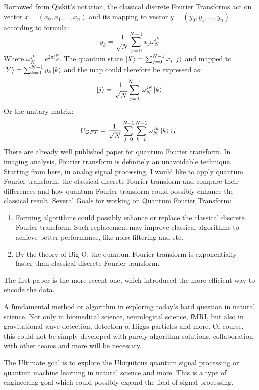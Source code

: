 \documentclass{article}
\begin{document}
Borrowed from Qiskit's notation, the classical discrete Fourier Transforms 
act on vector $x = (x_0, x_1,...,x_n)$ and its mapping to vector $y = (y_0, y_1,...,y_n)$
according to formula:
\begin{equation}
  y_k = \frac{1}{\sqrt{N}} \sum^{N-1}_{j=0} x_j \omega_N^{jk}
\end{equation}
Where $\omega_N^{jk} = e^{2\pi i \frac{jk}{N}}$. The quantum state 
$ \ket{X} = \sum^{N-1}_{j=0} x_j \ket{j} $ and mapped to $ \ket{Y} = \sum^{N-1}_{k=0} y_k \ket{k} $ 
and the map could therefore be expressed as:
\begin{equation}
  \ket{j}  = \frac{1}{\sqrt{N}} \sum^{N-1}_{j=0} \omega_N^{jk} \ket{k}
\end{equation}
Or the unitary matrix: 
\begin{equation}
  U_{QFT}= \frac{1}{\sqrt{N}} \sum^{N-1}_{j=0} \sum^{N-1}_{k=0}  \omega_N^{jk} \ket{k} \bra{j}
\end{equation}
There are already well published paper for quantum Fourier transform. In imaging analysis, 
Fourier transform is definitely an unavoidable technique. Starting from here, 
in analog signal processing, I would like to apply quantum Fourier transform, 
the classical discrete Fourier transform and compare their differences and how 
quantum Fourier transform could possibly enhance the classical result. 
Several Goals for working on Quantum Fourier Transform:
\begin{enumerate}
  \item Forming algorithms could possibly enhance or replace the classical 
  discrete Fourier transform. Such replacement may improve classical 
  algorithms to achieve better performance, like noise filtering and etc. 
  \item By the theory of Big-O, the quantum Fourier transform is exponentially 
  faster than classical discrete Fourier transform. 
\end{enumerate}


The first paper is the more recent one, which introduced the 
more efficient way to encode the data. 

A fundamental method or algorithm in exploring today's 
hard question in natural science. Not only in biomedical science, 
neurological science, fMRI, but also in gravitational 
wave detection, detection of Higgs particles and more. 
Of course, this could not be simply developed with purely 
algorithm solutions, collaboration with other teams and
 more will be necessary. 

The Ultimate goal is to explore the 
 Ubiquitous quantum signal processing or 
 quantum machine learning in natural science and more. 
This is a type of engineering goal which could possibly expand the 
 field of signal processing. 
\end{document}
